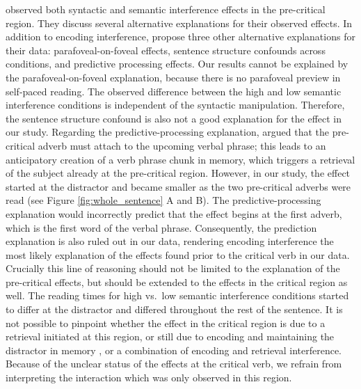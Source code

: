 \documentclass[a4paper, man, floatsintext]{apa7}
\begin{document}
\textcite{mertzen} observed both syntactic and semantic interference effects in the pre-critical region. 
They discuss several alternative explanations for their observed effects. In addition to encoding interference, \textcite{mertzen} propose three other alternative explanations for their data: parafoveal-on-foveal effects, sentence structure confounds across conditions, and predictive processing effects. Our results cannot be explained by the parafoveal-on-foveal explanation, because there is no parafoveal preview in self-paced reading. The observed difference between the high and low semantic interference conditions is independent of the syntactic manipulation. Therefore, the sentence structure confound is also not a good explanation for the effect in our study. Regarding the predictive-processing explanation, \citet{mertzen} argued that the pre-critical adverb must attach to the upcoming verbal phrase; this leads to an anticipatory creation of a verb phrase chunk in memory, which triggers a retrieval of the subject already at the pre-critical region. However, in our study, the effect started at the distractor and became smaller as the two pre-critical adverbs were read (see Figure \ref{fig:whole_sentence} A and B). The predictive-processing explanation would incorrectly predict that the effect begins at the first adverb, which is the first word of the verbal phrase. Consequently, the prediction explanation is also ruled out in our data, rendering encoding interference the most likely explanation of the effects found prior to the critical verb in our data. Crucially this line of reasoning should not be limited to the explanation of the pre-critical effects, but should be extended to the effects in the critical region as well. The reading times for high vs.\ low semantic interference conditions started to differ at the distractor and differed throughout the rest of the sentence. It is not possible to pinpoint whether the effect in the critical region is due to a retrieval initiated at this region, or still due to encoding and maintaining the distractor in memory \citep{ness2017}, or a combination of encoding and retrieval interference. Because of the unclear status of the effects at the critical verb, we refrain from interpreting the interaction which was only observed in this region.
\end{document}
